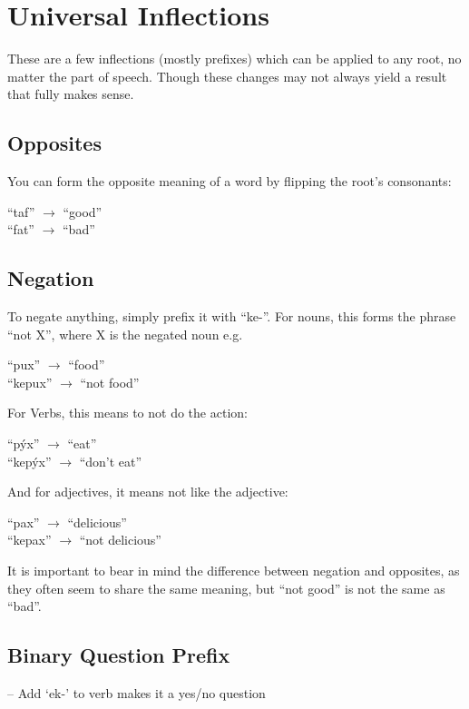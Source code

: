 \documentclass{book}
\begin{document}
\section{Universal Inflections}
These are a few inflections (mostly prefixes) which can be applied to any root, no matter the
part of speech. Though these changes may not always yield a result that fully makes sense.

\subsection{Opposites}
You can form the opposite meaning of a word by flipping the root's consonants:

\begin{center}
    ``taf'' $\rightarrow$ ``good'' \\
    ``fat'' $\rightarrow$ ``bad''
\end{center}

\subsection{Negation}
To negate anything, simply prefix it with ``ke-''. For nouns, this forms the phrase ``not X'', where X
is the negated noun e.g.

\begin{center}
    ``pux'' $\rightarrow$ ``food'' \\
    ``kepux'' $\rightarrow$ ``not food''
\end{center}

For Verbs, this means to not do the action:

\begin{center}
    ``pýx'' $\rightarrow$ ``eat'' \\
    ``kepýx'' $\rightarrow$ ``don't eat''
\end{center}

And for adjectives, it means not like the adjective:

\begin{center}
    ``pax'' $\rightarrow$ ``delicious'' \\
    ``kepax'' $\rightarrow$ ``not delicious''
\end{center}

It is important to bear in mind the difference between negation and opposites, as they often
seem to share the same meaning, but ``not good'' is not the same as ``bad''.

\subsection{Binary Question Prefix}
-- Add `ek-' to verb makes it a yes/no question
\end{document}

